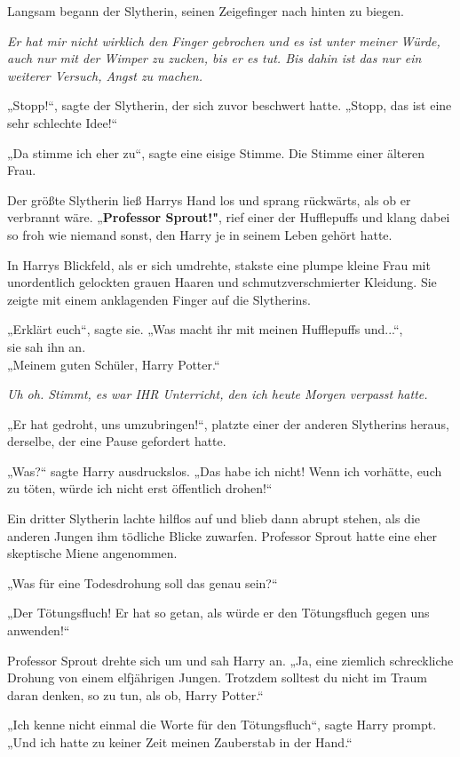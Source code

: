 {Langsam begann der Slytherin, seinen Zeigefinger nach hinten zu biegen.

\emph{Er hat mir nicht wirklich den Finger gebrochen und es ist unter meiner Würde, auch nur mit der Wimper zu zucken, bis er es tut. Bis dahin ist das nur ein weiterer Versuch, Angst zu machen.}

„Stopp!“, sagte der Slytherin, der sich zuvor beschwert hatte. „Stopp, das ist eine sehr schlechte Idee!“

„Da stimme ich eher zu“, sagte eine eisige Stimme. Die Stimme einer älteren Frau.

Der größte Slytherin ließ Harrys Hand los und sprang rückwärts, als ob er verbrannt wäre. „\textbf{Professor Sprout!"}, rief einer der Hufflepuffs und klang dabei so froh wie niemand sonst, den Harry je in seinem Leben gehört hatte.

In Harrys Blickfeld, als er sich umdrehte, stakste eine plumpe kleine Frau mit unordentlich gelockten grauen Haaren und schmutzverschmierter Kleidung. Sie zeigte mit einem anklagenden Finger auf die Slytherins.

„Erklärt euch“, sagte sie. „Was macht ihr mit meinen Hufflepuffs und...“,\\ sie sah ihn an.\\ „Meinem guten Schüler, Harry Potter.“

\emph{Uh oh. Stimmt, es war IHR Unterricht, den ich heute Morgen verpasst hatte.}

„Er hat gedroht, uns umzubringen!“, platzte einer der anderen Slytherins heraus, derselbe, der eine Pause gefordert hatte.

„Was?“ sagte Harry ausdruckslos. „Das habe ich nicht! Wenn ich vorhätte, euch zu töten, würde ich nicht erst öffentlich drohen!“

Ein dritter Slytherin lachte hilflos auf und blieb dann abrupt stehen, als die anderen Jungen ihm tödliche Blicke zuwarfen. Professor Sprout hatte eine eher skeptische Miene angenommen.

„Was für eine Todesdrohung soll das genau sein?“

„Der Tötungsfluch! Er hat so getan, als würde er den Tötungsfluch gegen uns anwenden!“

Professor Sprout drehte sich um und sah Harry an. „Ja, eine ziemlich schreckliche Drohung von einem elfjährigen Jungen. Trotzdem solltest du nicht im Traum daran denken, so zu tun, als ob, Harry Potter.“

„Ich kenne nicht einmal die Worte für den Tötungsfluch“, sagte Harry prompt. „Und ich hatte zu keiner Zeit meinen Zauberstab in der Hand.“

}
